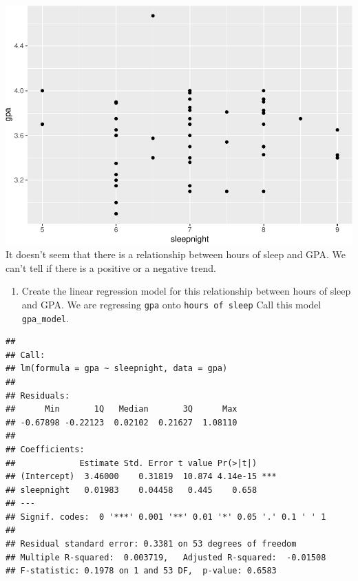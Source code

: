 \documentclass[]{article}
\newenvironment{Shaded}{\begin{snugshade}}{\end{snugshade}}
\newcommand{\DataTypeTok}[1]{\textcolor[rgb]{0.13,0.29,0.53}{#1}}
\newcommand{\KeywordTok}[1]{\textcolor[rgb]{0.13,0.29,0.53}{\textbf{#1}}}
\newcommand{\NormalTok}[1]{#1}
\newcommand{\OperatorTok}[1]{\textcolor[rgb]{0.81,0.36,0.00}{\textbf{#1}}}
\newcommand{\StringTok}[1]{\textcolor[rgb]{0.31,0.60,0.02}{#1}}
\providecommand{\tightlist}{%
  \setlength{\itemsep}{0pt}\setlength{\parskip}{0pt}}
\begin{document}
\includegraphics{lab-8-regression_files/figure-latex/unnamed-chunk-3-1.pdf}
It doesn't seem that there is a relationship between hours of sleep and
GPA. We can't tell if there is a positive or a negative trend.

\begin{enumerate}
\def\labelenumi{\arabic{enumi}.}
\setcounter{enumi}{2}
\tightlist
\item
  Create the linear regression model for this relationship between hours
  of sleep and GPA. We are regressing \texttt{gpa} onto
  \texttt{hours\ of\ sleep} Call this model \texttt{gpa\_model}.
\end{enumerate}

\begin{Shaded}
\end{Shaded}

\begin{verbatim}
## 
## Call:
## lm(formula = gpa ~ sleepnight, data = gpa)
## 
## Residuals:
##      Min       1Q   Median       3Q      Max 
## -0.67898 -0.22123  0.02102  0.21627  1.08110 
## 
## Coefficients:
##             Estimate Std. Error t value Pr(>|t|)    
## (Intercept)  3.46000    0.31819  10.874 4.14e-15 ***
## sleepnight   0.01983    0.04458   0.445    0.658    
## ---
## Signif. codes:  0 '***' 0.001 '**' 0.01 '*' 0.05 '.' 0.1 ' ' 1
## 
## Residual standard error: 0.3381 on 53 degrees of freedom
## Multiple R-squared:  0.003719,   Adjusted R-squared:  -0.01508 
## F-statistic: 0.1978 on 1 and 53 DF,  p-value: 0.6583
\end{verbatim}
\end{document}
